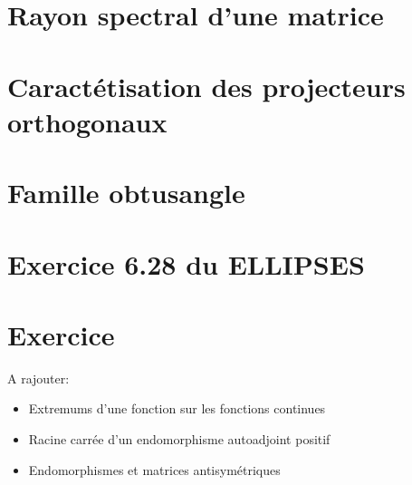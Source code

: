 \section{Rayon spectral d'une matrice} \label{rayon_spectral}


\section{Caractétisation des projecteurs orthogonaux}


\section{Famille obtusangle}


\section{Exercice 6.28 du ELLIPSES}


\section{Exercice}


A rajouter:
\begin{itemize}
    \item Extremums d'une fonction sur les fonctions continues
    \item Racine carrée d'un endomorphisme autoadjoint positif
    \item Endomorphismes et matrices antisymétriques
\end{itemize}